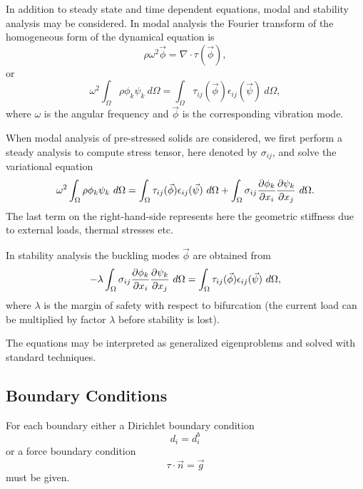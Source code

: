 \begin{versiona}
In addition to steady state and time dependent equations, modal and stability analysis
may be considered. In modal analysis the Fourier transform of the homogeneous form of
the dynamical equation is
\begin{equation}
  \rho\omega^2\Vec{\phi} = \nabla\cdot\tau(\Vec{\phi}),
\end{equation}
or
\begin{equation}
\omega^2  \int_\Omega \rho \phi_k \psi_k \ d\Omega = \int_\Omega
\tau_{ij}(\Vec{\phi}) \epsilon_{ij}(\Vec{\psi}) \ d\Omega,
\end{equation}
where $\omega$ is the angular frequency and $\vec \phi$ is the corresponding
vibration mode.

When modal analysis of pre-stressed solids are considered, we first perform a steady
analysis to compute stress tensor, here denoted by $\sigma_{ij}$, and solve the
variational equation
\begin{equation}
\omega^2  \int_\Omega \rho \phi_k \psi_k \ d\Omega = \int_\Omega
\tau_{ij}(\Vec{\phi}) \epsilon_{ij}(\Vec{\psi}) \ d\Omega + \int_\Omega
\sigma_{ij}{\partial\phi_k \over \partial x_i}{\partial \psi_k\over \partial x_j} \ d\Omega.
\end{equation}
The last term on the right-hand-side represents here the geometric stiffness due to 
external loads, thermal stresses etc.

In stability analysis the buckling modes $\Vec\phi$ are obtained from
\begin{equation}
-\lambda \int_\Omega\sigma_{ij} {\partial \phi_k \over \partial x_i}{\partial \psi_k
\over \partial x_j }  \ d\Omega = 
\int_\Omega \tau_{ij}(\Vec \phi)  \epsilon_{ij}(\Vec \psi) \ d\Omega,
 \end{equation}
where $\lambda$ is the margin of safety with respect to bifurcation (the
current load can be multiplied by factor $\lambda$ before stability is lost). 

The equations may be interpreted as generalized eigenproblems and solved
with standard techniques.


\subsection{Boundary Conditions}

For each boundary either a Dirichlet boundary condition
\begin{equation}
d_i = d_i^b
\end{equation}
or a force boundary condition 
\begin{equation}
\tau\cdot\Vec{n} = \Vec{g}
\end{equation}
must be given.


\end{versiona}
